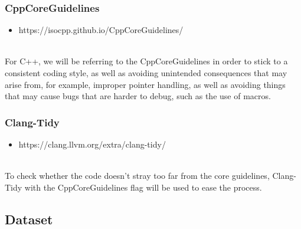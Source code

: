 \documentclass[conference]{IEEEtran}
\begin{document}
\subsubsection{CppCoreGuidelines}
\begin{itemize}
\item https://isocpp.github.io/CppCoreGuidelines/
\end{itemize}~\\
For C++, we will be referring to the CppCoreGuidelines in order to stick to a consistent coding style, as well as avoiding unintended consequences that may arise from, for example, improper pointer handling, as well as avoiding things that may cause bugs that are harder to debug, such as the use of macros.
\newline
\subsubsection{Clang-Tidy}
\begin{itemize}
\item https://clang.llvm.org/extra/clang-tidy/
\end{itemize}~\\
To check whether the code doesn't stray too far from the core guidelines, Clang-Tidy with the CppCoreGuidelines flag will be used to ease the process.~\\

\subsection{Dataset}
\end{document}
